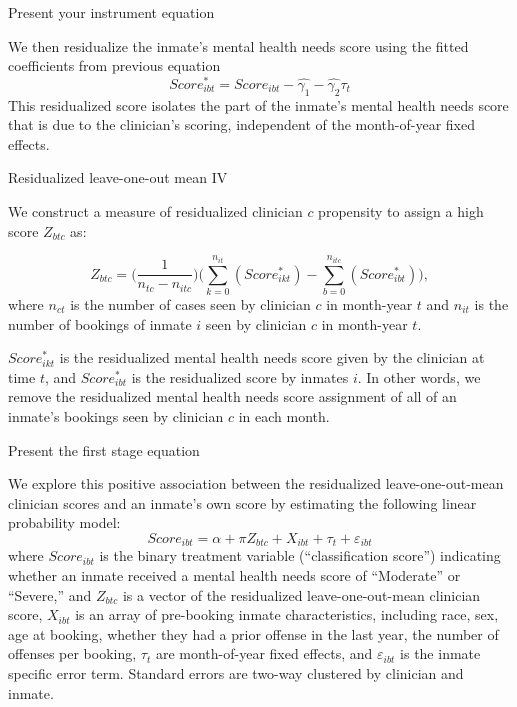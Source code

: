 \documentclass{beamer}
\begin{document}
\begin{frame}{Present your instrument equation}

We then residualize the inmate's mental health needs score using the fitted coefficients from previous equation
\begin{equation}
    \label{eq:residual2}
    Score^{*}_{ibt} = Score_{ibt} - \widehat{\gamma_1} - \widehat{\gamma_2} \tau_{t}
\end{equation}
This residualized score isolates the part of the inmate's mental health needs score that is due to the clinician's scoring, independent of the month-of-year fixed effects. 

\end{frame}


\begin{frame}{Residualized leave-one-out mean IV}

We construct a measure of residualized clinician $c$ propensity to assign a high score $Z_{btc}$ as:

\begin{equation}
    \label{eq:instrument}
    Z_{btc} = \bigg(\frac{1}{n_{tc}-n_{itc}}\bigg) \bigg( \sum_{k=0}^{n_{it}} (Score^{*}_{ikt}) - \sum_{b=0}^{n_{itc}} (Score^{*}_{ibt}) \bigg),
\end{equation} where $n_{ct}$ is the number of cases seen by clinician $c$ in month-year $t$ and $n_{it}$ is the number of bookings of inmate $i$ seen by clinician $c$ in month-year $t$.

\bigskip

$Score^{*}_{ikt}$ is the residualized mental health needs score given by the clinician at time $t$, and $Score^{*}_{ibt}$ is the residualized score by inmates $i$.   In other words, we remove the residualized mental health needs score assignment of all of an inmate’s bookings seen by clinician $c$ in each month.

\end{frame}

\begin{frame}{Present the first stage equation}

We explore this positive association between the residualized leave-one-out-mean clinician scores and an inmate's own score by estimating the following linear probability model:
\begin{equation}
Score_{ibt} = \alpha + \pi Z_{btc} + X_{ibt} + \tau_t + \varepsilon_{ibt}\label{eq:firststage}
\end{equation}where $Score_{ibt}$ is the binary treatment variable (``classification score'') indicating whether an inmate received a mental health needs score of ``Moderate'' or ``Severe,'' and $Z_{btc}$ is a vector of the residualized leave-one-out-mean clinician score, $X_{ibt}$ is an array of pre-booking inmate characteristics, including race, sex, age at booking, whether they had a prior offense in the last year, the number of offenses per booking, $\tau_t$ are month-of-year fixed effects, and $\varepsilon_{ibt}$ is the inmate specific error term. Standard errors are two-way clustered by clinician and inmate.   

\end{frame}
\end{document}
